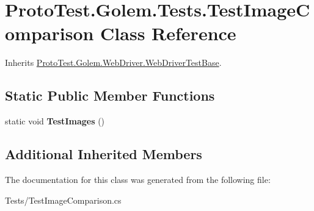\hypertarget{class_proto_test_1_1_golem_1_1_tests_1_1_test_image_comparison}{\section{Proto\-Test.\-Golem.\-Tests.\-Test\-Image\-Comparison Class Reference}
\label{class_proto_test_1_1_golem_1_1_tests_1_1_test_image_comparison}
}


Inherits \hyperlink{class_proto_test_1_1_golem_1_1_web_driver_1_1_web_driver_test_base}{Proto\-Test.\-Golem.\-Web\-Driver.\-Web\-Driver\-Test\-Base}.

\subsection*{Static Public Member Functions}
\begin{DoxyCompactItemize}
\item 
\hypertarget{class_proto_test_1_1_golem_1_1_tests_1_1_test_image_comparison_ac90f4151d98ea56c99ddbad2cb8a5f81}{static void {\bfseries Test\-Images} ()}\label{class_proto_test_1_1_golem_1_1_tests_1_1_test_image_comparison_ac90f4151d98ea56c99ddbad2cb8a5f81}

\end{DoxyCompactItemize}
\subsection*{Additional Inherited Members}


The documentation for this class was generated from the following file\-:\begin{DoxyCompactItemize}
\item 
Tests/Test\-Image\-Comparison.\-cs\end{DoxyCompactItemize}
